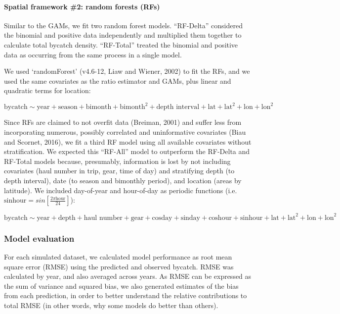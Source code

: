 \documentclass[]{article}
\let\oldparagraph\paragraph
\renewcommand{\paragraph}[1]{\oldparagraph{#1}\mbox{}}
\begin{document}
\paragraph{Spatial framework \#2: random forests
(RFs)}\label{spatial-framework-2-random-forests-rfs}

Similar to the GAMs, we fit two random forest models. ``RF-Delta''
considered the binomial and positive data independently and multiplied
them together to calculate total bycatch density. ``RF-Total'' treated
the binomial and positive data as occurring from the same process in a
single model.

We used `randomForest' (v4.6-12, Liaw and Wiener, 2002) to fit the RFs,
and we used the same covariates as the ratio estimator and GAMs, plus
linear and quadratic terms for location:

\[ \text{bycatch} \sim \text{year} + \text{season} + \text{bimonth} + \text{bimonth}^2 + \text{depth interval} + \text{lat} + \text{lat}^2 + \text{lon} + \text{lon}^2\]

Since RFs are claimed to not overfit data (Breiman, 2001) and suffer
less from incorporating numerous, possibly correlated and uninformative
covariates (Biau and Scornet, 2016), we fit a third RF model using all
available covariates without stratification. We expected this ``RF-All''
model to outperform the RF-Delta and RF-Total models because,
presumably, information is lost by not including covariates (haul number
in trip, gear, time of day) and stratifying depth (to depth interval),
date (to season and bimonthly period), and location (areas by latitude).
We included day-of-year and hour-of-day as periodic functions (i.e.
\(\text{sinhour} = sin \left[ \frac{2 \pi \text{hour}}{24} \right]\)):

\[ \text{bycatch} \sim \text{year} + \text{depth} + \text{haul number} + \text{gear} + \text{cosday} + \text{sinday} + \text{coshour} + \text{sinhour} + \text{lat} + \text{lat}^2 + \text{lon} + \text{lon}^2\]

\subsubsection{Model evaluation}\label{model-evaluation}

For each simulated dataset, we calculated model performance as root mean
square error (RMSE) using the predicted and observed bycatch. RMSE was
calculated by year, and also averaged across years. As RMSE can be
expressed as the sum of variance and squared bias, we also generated
estimates of the bias from each prediction, in order to better
understand the relative contributions to total RMSE (in other words, why
some models do better than others).
\end{document}
